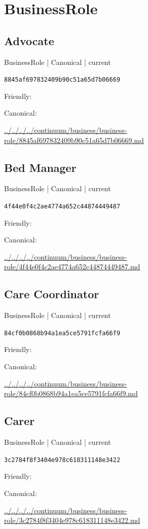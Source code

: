 \documentclass[10pt,a4paper]{article}
\begin{document}
\section*{BusinessRole}
\subsection*{Advocate}
{\small BusinessRole | Canonical | current}\par
\texttt{8845af697832409b90c51a65d7b06669}\par
Friendly: \par
Canonical: \par
{\footnotesize\url{../../../../continuum/business/business-role/8845af697832409b90c51a65d7b06669.md}}\par
\subsection*{Bed Manager}
{\small BusinessRole | Canonical | current}\par
\texttt{4f44e0f4c2ae4774a652c44874449487}\par
Friendly: \par
Canonical: \par
{\footnotesize\url{../../../../continuum/business/business-role/4f44e0f4c2ae4774a652c44874449487.md}}\par
\subsection*{Care Coordinator}
{\small BusinessRole | Canonical | current}\par
\texttt{84cf0b0868b94a1ea5ce5791fcfa66f9}\par
Friendly: \par
Canonical: \par
{\footnotesize\url{../../../../continuum/business/business-role/84cf0b0868b94a1ea5ce5791fcfa66f9.md}}\par
\subsection*{Carer}
{\small BusinessRole | Canonical | current}\par
\texttt{3c2784f8f3404e978c618311148e3422}\par
Friendly: \par
Canonical: \par
{\footnotesize\url{../../../../continuum/business/business-role/3c2784f8f3404e978c618311148e3422.md}}\par
\end{document}
